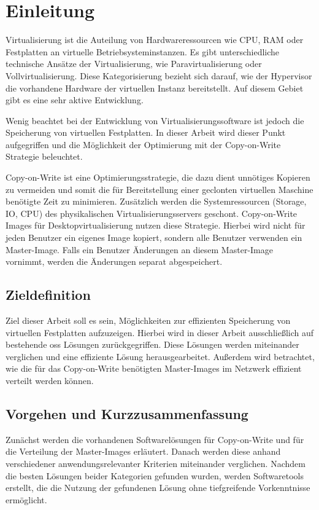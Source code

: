 \chapter{Einleitung}

Virtualisierung ist die Auteilung von Hardwareressourcen wie CPU, RAM oder Festplatten an virtuelle Betriebsysteminstanzen. Es gibt unterschiedliche technische Ansätze der Virtualisierung, wie Paravirtualisierung oder Vollvirtualisierung. Diese Kategorisierung bezieht sich darauf, wie der Hypervisor die vorhandene Hardware der virtuellen Instanz bereitstellt. Auf diesem Gebiet gibt es eine sehr aktive Entwicklung. \cite{baun}

Wenig beachtet bei der Entwicklung von Virtualisierungssoftware ist jedoch die Speicherung von virtuellen Festplatten. In dieser Arbeit wird dieser Punkt aufgegriffen und die Möglichkeit der Optimierung mit der Copy-on-Write Strategie beleuchtet.

Copy-on-Write ist eine Optimierungsstrategie, die dazu dient unnötiges Kopieren zu vermeiden und somit die für Bereitstellung einer geclonten virtuellen Maschine benötigte Zeit zu minimieren. Zusätzlich werden die Systemressourcen (Storage, IO, CPU) des physikalischen Virtualisierungsservers geschont. Copy-on-Write Images für Desktopvirtualisierung nutzen diese Strategie. Hierbei wird nicht für jeden Benutzer ein eigenes Image kopiert, sondern alle Benutzer verwenden ein Master-Image. Falls ein Benutzer Änderungen an diesem Master-Image vornimmt, werden die Änderungen separat abgespeichert. 

\section{Zieldefinition}
Ziel dieser Arbeit soll es sein, Möglichkeiten zur effizienten Speicherung von virtuellen Festplatten aufzuzeigen. Hierbei wird in dieser Arbeit ausschließlich auf bestehende \gls{oss} Lösungen zurückgegriffen. Diese Lösungen werden miteinander verglichen und eine effiziente Lösung herausgearbeitet. Außerdem wird betrachtet, wie die für das Copy-on-Write benötigten Master-Images im Netzwerk effizient verteilt werden können. 

\section{Vorgehen und Kurzzusammenfassung} 

Zunächst werden die vorhandenen Softwarelösungen für Copy-on-Write und für die Verteilung der Master-Images erläutert. Danach werden diese anhand verschiedener anwendungsrelevanter Kriterien miteinander verglichen. Nachdem die besten Lösungen beider Kategorien gefunden wurden, werden Softwaretools erstellt, die die Nutzung der gefundenen Lösung ohne tiefgreifende Vorkenntnisse ermöglicht.

